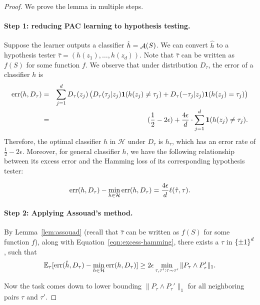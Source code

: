 \documentclass{article}
\DeclareMathOperator*{\err}{{\rm err}}
\DeclareMathOperator*{\Acal}{{\cal A}}
\newcommand{\EE}{\mathbb{E}}
\newcommand{\Hcal}{\mathcal{H}}
\newcommand*{\one}{{\bf 1}}
\begin{document}
\begin{proof} We prove the lemma in multiple steps.
\paragraph{Step 1: reducing PAC learning to hypothesis testing.} Suppose the learner outputs a classifier $\hat{h} = \Acal(S)$. We can convert $\hat{h}$ to a hypothesis tester $\hat{\tau} = (h(z_1), \ldots, h(z_d))$. Note that $\hat{\tau}$ can be written as $f(S)$ for some function $f$.
We observe that under distribution $D_\tau$, the error of a classifier $h$ is
\begin{eqnarray*}
\err(h, D_\tau)
&=& \sum_{j=1}^d D_\tau(z_j) \del{D_\tau(\tau_j|z_j) \one(h(z_j) \neq \tau_j) +
D_\tau(-\tau_j|z_j) \one(h(z_j) = \tau_j)} \\
&=& (\frac12 - 2\epsilon) + \frac{4\epsilon}{d} \cdot \sum_{j=1}^d \one(h(z_j) \neq \tau_j).
\end{eqnarray*}
Therefore, the optimal classifier $h$ in $\Hcal$ under $D_\tau$ is $h_\tau$, which has an
error rate of $\frac12 - 2\epsilon$. Moreover, for general classifier $h$, we have the following relationship between its excess error and the Hamming loss of its corresponding hypothesis tester:

\begin{equation}
  \err(h, D_\tau) - \min_{h \in \Hcal} \err(h, D_\tau) = \frac{4\epsilon}{d} \ell(\hat{\tau}, \tau).
  \label{eqn:excess-hamming}
\end{equation}

\paragraph{Step 2: Applying Assouad's method.} By Lemma~\ref{lem:assouad} (recall that $\hat{\tau}$ can be written as $f(S)$ for some function $f$), along with Equation~\eqref{eqn:excess-hamming}, there exists a $\tau$ in $\cbr{\pm 1}^d$, such that
\begin{equation}
  \EE_\tau[\err(\hat{h}, D_\tau) - \min_{h \in \Hcal} \err(h, D_\tau)] \geq 2 \epsilon \min_{\tau, \tau': \tau \sim \tau'} \| P_\tau \wedge P_\tau' \|_1.
  \label{eqn:excess-sim}
\end{equation}

Now the task comes down to lower bounding $\| P_\tau \wedge P_\tau' \|_1$ for all neighboring
pairs $\tau$ and $\tau'$.


\end{proof}
\end{document}
